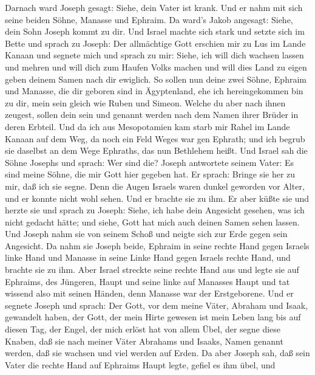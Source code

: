 Darnach ward Joseph gesagt: Siehe, dein Vater ist krank.
Und er nahm mit sich seine beiden Söhne, Manasse und Ephraim.
 Da ward's Jakob angesagt: Siehe, dein Sohn Joseph kommt zu
dir. Und Israel machte sich stark und setzte sich im Bette 
und sprach zu Joseph: Der allmächtige Gott erschien mir zu Lus im Lande
Kanaan und segnete mich  und sprach zu mir: Siehe, ich will
dich wachsen lassen und mehren und will dich zum Haufen Volks machen und
will dies Land zu eigen geben deinem Samen nach dir ewiglich.
 So sollen nun deine zwei Söhne, Ephraim und Manasse, die
dir geboren sind in Ägyptenland, ehe ich hereingekommen bin zu dir, mein
sein gleich wie Ruben und Simeon.  Welche du aber nach ihnen
zeugest, sollen dein sein und genannt werden nach dem Namen ihrer Brüder
in deren Erbteil.  Und da ich aus Mesopotamien kam starb mir
Rahel im Lande Kanaan auf dem Weg, da noch ein Feld Weges war gen
Ephrath; und ich begrub sie daselbst an dem Wege Ephraths, das nun
Bethlehem heißt.  Und Israel sah die Söhne Josephs und
sprach: Wer sind die?  Joseph antwortete seinem Vater: Es
sind meine Söhne, die mir Gott hier gegeben hat. Er sprach: Bringe sie
her zu mir, daß ich sie segne.  Denn die Augen Israels
waren dunkel geworden vor Alter, und er konnte nicht wohl sehen. Und er
brachte sie zu ihm. Er aber küßte sie und herzte sie  und
sprach zu Joseph: Siehe, ich habe dein Angesicht gesehen, was ich nicht
gedacht hätte; und siehe, Gott hat mich auch deinen Samen sehen lassen.
 Und Joseph nahm sie von seinem Schoß und neigte sich zur
Erde gegen sein Angesicht.  Da nahm sie Joseph beide,
Ephraim in seine rechte Hand gegen Israels linke Hand und Manasse in
seine Linke Hand gegen Israels rechte Hand, und brachte sie zu ihm.
 Aber Israel streckte seine rechte Hand aus und legte sie
auf Ephraims, des Jüngeren, Haupt und seine linke auf Manasses Haupt und
tat wissend also mit seinen Händen, denn Manasse war der Erstgeborene.
 Und er segnete Joseph und sprach: Der Gott, vor dem meine
Väter, Abraham und Isaak, gewandelt haben, der Gott, der mein Hirte
gewesen ist mein Leben lang bis auf diesen Tag,  der Engel,
der mich erlöst hat von allem Übel, der segne diese Knaben, daß sie nach
meiner Väter Abrahams und Isaaks, Namen genannt werden, daß sie wachsen
und viel werden auf Erden.  Da aber Joseph sah, daß sein
Vater die rechte Hand auf Ephraims Haupt legte, gefiel es ihm übel, und
